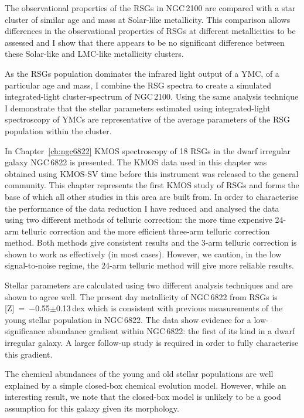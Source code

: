 The observational properties of the RSGs in NGC\,2100 are compared with a star cluster of similar age and mass at Solar-like metallicity.
This comparison allows differences in the observational properties of RSGs at different metallicities to be assessed and I show that there appears to be no significant difference between these Solar-like and LMC-like metallicity clusters.

As the RSGs population dominates the infrared light output of a YMC, of a particular age and mass, I combine the RSG spectra to create a simulated integrated-light cluster-spectrum of NGC\,2100.
Using the same analysis technique I demonstrate that the stellar parameters estimated using integrated-light spectroscopy of YMCs are representative of the average parameters of the RSG population within the cluster.

In Chapter~\ref{ch:ngc6822} KMOS spectroscopy of 18 RSGs in the dwarf irregular galaxy NGC\,6822 is presented.
The KMOS data used in this chapter was obtained using KMOS-SV time before this instrument was released to the general community.
This chapter represents the first KMOS study of RSGs and forms the base of which all other studies in this area are built from.
In order to characterise the performance of the data reduction I have reduced and analysed the data using two different methods of telluric correction: the more time expensive 24-arm telluric correction and the more efficient three-arm telluric correction method.
Both methods give consistent results and the 3-arm telluric correction is shown to work as effectively (in most cases).
However, we caution, in the low signal-to-noise regime, the 24-arm telluric method will give more reliable results.

Stellar parameters are calculated using two different analysis techniques and are shown to agree well.
The present day metallicity of NGC\,6822 from RSGs is
[Z]~=~$-$0.55$\pm$0.13\,dex which is consistent with previous measurements of the young stellar population in NGC\,6822.
The data show evidence for a low-significance abundance gradient within NGC\,6822: the first of its kind in a dwarf irregular galaxy.
A larger follow-up study is required in order to fully characterise this gradient.

The chemical abundances of the young and old stellar populations are well explained by a simple closed-box chemical evolution model.
However, while an interesting result, we note that the closed-box model is unlikely to be a good assumption for this galaxy given its morphology.

